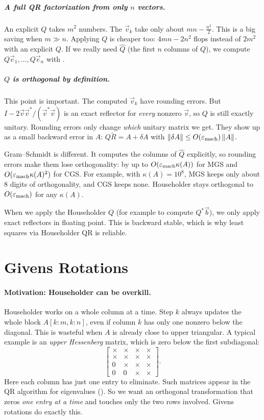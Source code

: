 \subparagraph{A full QR factorization from only $n$ vectors.} An explicit $Q$ takes $m^2$ numbers. The $\vec{v}_k$ take only about $mn - \frac{n^2}{2}$. This is a big saving when $m \gg n$. Applying $Q$ is cheaper too: $4mn - 2n^2$ flops instead of $2m^2$ with an explicit $Q$. If we really need $\hat{Q}$ (the first $n$ columns of $Q$), we compute $Q\vec{e}_1, \dots, Q\vec{e}_n$ with .

\subparagraph{$Q$ is orthogonal by definition.} This point is important. The computed $\vec{v}_k$ have rounding errors. But $I - 2\vec{v}\vec{v}^\ast/(\vec{v}^\ast\vec{v})$ is an exact reflector for \emph{every} nonzero $\vec{v}$, so $Q$ is still exactly unitary. Rounding errors only change \emph{which} unitary matrix we get. They show up as a small backward error in $A$: $Q\tilde{R} = A + \delta A$ with $\left\lVert \delta A \right\rVert \le O(\varepsilon_{\mathrm{mach}})\left\lVert A \right\rVert$.

Gram--Schmidt is different. It computes the columns of $\hat{Q}$ explicitly, so rounding errors make them lose orthogonality: by up to $O(\varepsilon_{\mathrm{mach}}\kappa(A))$ for MGS and $O(\varepsilon_{\mathrm{mach}}\kappa(A)^2)$ for CGS. For example, with $\kappa(A) = 10^8$, MGS keeps only about $8$ digits of orthogonality, and CGS keeps none. Householder stays orthogonal to $O(\varepsilon_{\mathrm{mach}})$ for any $\kappa(A)$.

When we apply the Householder $Q$ (for example to compute $Q^\ast\vec{b}$), we only apply exact reflectors in floating point. This is backward stable, which is why least squares via Householder QR is reliable.

\clearpage
\section{Givens Rotations}
\label{sec:givens}

\paragraph{Motivation: Householder can be overkill.} Householder works on a whole column at a time. Step $k$ always updates the whole block $A[k{:}m, k{:}n]$, even if column $k$ has only one nonzero below the diagonal. This is wasteful when $A$ is already close to upper triangular. A typical example is an \emph{upper Hessenberg} matrix, which is zero below the first subdiagonal:
\begin{equation}
  \begin{bmatrix}
    \times & \times & \times & \times \\
    \times & \times & \times & \times \\
    0 & \times & \times & \times \\
    0 & 0 & \times & \times
  \end{bmatrix}.
\end{equation}
Here each column has just one entry to eliminate. Such matrices appear in the QR algorithm for eigenvalues (). So we want an orthogonal transformation that zeros \emph{one entry at a time} and touches only the two rows involved. Givens rotations do exactly this.

